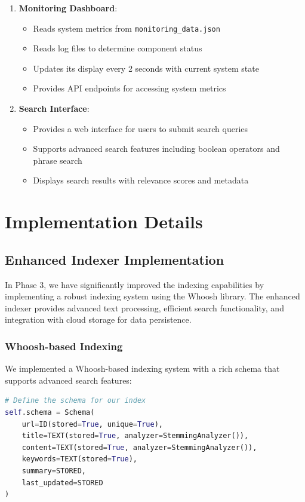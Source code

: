 \documentclass[12pt]{article}
\begin{document}
\begin{enumerate}
    \item \textbf{Monitoring Dashboard}:
    \begin{itemize}
        \item Reads system metrics from \texttt{monitoring\_data.json}
        \item Reads log files to determine component status
        \item Updates its display every 2 seconds with current system state
        \item Provides API endpoints for accessing system metrics
    \end{itemize}
    
    \item \textbf{Search Interface}:
    \begin{itemize}
        \item Provides a web interface for users to submit search queries
        \item Supports advanced search features including boolean operators and phrase search
        \item Displays search results with relevance scores and metadata
    \end{itemize}
\end{enumerate} 

\section{Implementation Details}

\subsection{Enhanced Indexer Implementation}
In Phase 3, we have significantly improved the indexing capabilities by implementing a robust indexing system using the Whoosh library. The enhanced indexer provides advanced text processing, efficient search functionality, and integration with cloud storage for data persistence.

\subsubsection{Whoosh-based Indexing}
We implemented a Whoosh-based indexing system with a rich schema that supports advanced search features:

\begin{lstlisting}[language=Python, caption=Whoosh Schema Implementation]
# Define the schema for our index
self.schema = Schema(
    url=ID(stored=True, unique=True),
    title=TEXT(stored=True, analyzer=StemmingAnalyzer()),
    content=TEXT(stored=True, analyzer=StemmingAnalyzer()),
    keywords=TEXT(stored=True),
    summary=STORED,
    last_updated=STORED
)
\end{lstlisting}
\end{document}
